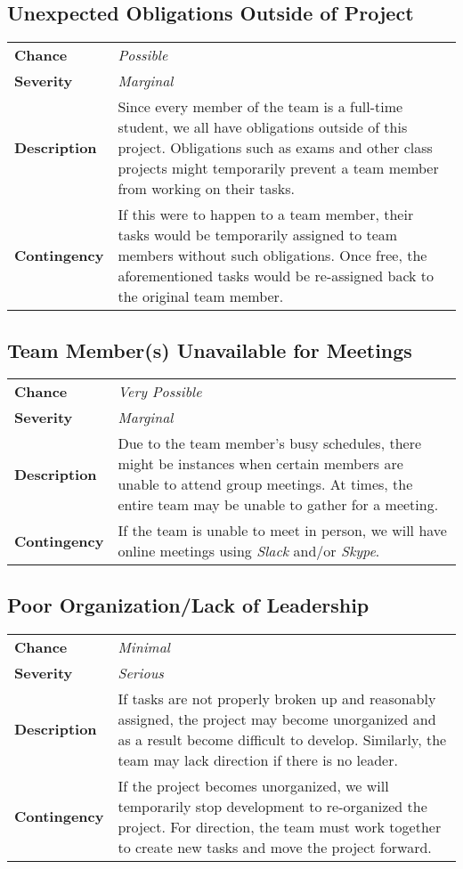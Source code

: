 \documentclass[12pt]{article}
\begin{document}
\subsection*{Unexpected Obligations Outside of Project}
\begin{tabular}{ l p{10cm} }
	\textbf{Chance} & \textit{Possible} \\
	\textbf{Severity} & \textit{Marginal} \\
	\textbf{Description} & Since every member of the team is a full-time
		student, we all have obligations outside of this project. Obligations
		such as exams and other class projects might temporarily prevent a team
		member from working on their tasks. \\
	\textbf{Contingency} & If this were to happen to a team member, their tasks
		would be temporarily assigned to team members without such obligations.
		Once free, the aforementioned tasks would be re-assigned back to the
		original team member. \\
\end{tabular}

\subsection*{Team Member(s) Unavailable for Meetings}
\begin{tabular}{ l p{10cm} }
	\textbf{Chance} & \textit{Very Possible} \\
	\textbf{Severity} & \textit{Marginal} \\
	\textbf{Description} & Due to the team member's busy schedules, there might
		be instances when certain members are unable to attend group meetings.
		At times, the entire team may be unable to gather for a meeting. \\
		\textbf{Contingency} & If the team is unable to meet in person, we will
		have online meetings using \textit{Slack} and/or \textit{Skype}.\\
\end{tabular}

\subsection*{Poor Organization/Lack of Leadership}
\begin{tabular}{ l p{10cm} }
	\textbf{Chance} & \textit{Minimal} \\
	\textbf{Severity} & \textit{Serious} \\
	\textbf{Description} & If tasks are not properly broken up and reasonably
		assigned, the project may become unorganized and as a result become
		difficult to develop. Similarly, the team may lack direction if there
		is no leader. \\
	\textbf{Contingency} & If the project becomes unorganized, we will
		temporarily stop development to re-organized the project. For
		direction, the team must work together to create new tasks and move the
		project forward. \\
\end{tabular}
\end{document}

